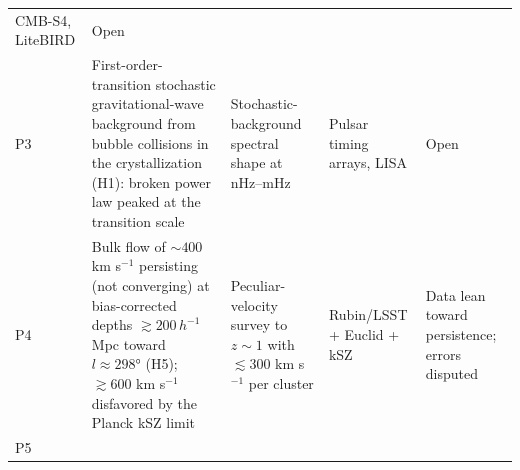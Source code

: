 \documentclass[
]{article}
\begin{document}
\begin{longtable}[]{@{}lllll@{}}
\begin{minipage}[t]{0.19\columnwidth}
CMB-S4, LiteBIRD\strut
\end{minipage} & \begin{minipage}[t]{0.19\columnwidth}\raggedright
Open\strut
\end{minipage}\tabularnewline
\begin{minipage}[t]{0.11\columnwidth}\raggedright
P3\strut
\end{minipage} & \begin{minipage}[t]{0.19\columnwidth}\raggedright
First-order-transition stochastic gravitational-wave background from
bubble collisions in the crystallization (H1): broken power law peaked
at the transition scale\strut
\end{minipage} & \begin{minipage}[t]{0.19\columnwidth}\raggedright
Stochastic-background spectral shape at nHz--mHz\strut
\end{minipage} & \begin{minipage}[t]{0.19\columnwidth}\raggedright
Pulsar timing arrays, LISA\strut
\end{minipage} & \begin{minipage}[t]{0.19\columnwidth}\raggedright
Open\strut
\end{minipage}\tabularnewline
\begin{minipage}[t]{0.11\columnwidth}\raggedright
P4\strut
\end{minipage} & \begin{minipage}[t]{0.19\columnwidth}\raggedright
Bulk flow of \(\sim\!400\) km s\(^{-1}\) persisting (not converging) at
bias-corrected depths \(\gtrsim 200\,h^{-1}\) Mpc toward
\(l \approx 298°\) (H5); \(\gtrsim 600\) km s\(^{-1}\) disfavored by the
Planck kSZ limit\strut
\end{minipage} & \begin{minipage}[t]{0.19\columnwidth}\raggedright
Peculiar-velocity survey to \(z \sim 1\) with \(\lesssim 300\) km
s\(^{-1}\) per cluster\strut
\end{minipage} & \begin{minipage}[t]{0.19\columnwidth}\raggedright
Rubin/LSST + Euclid + kSZ\strut
\end{minipage} & \begin{minipage}[t]{0.19\columnwidth}\raggedright
Data lean toward persistence; errors disputed\strut
\end{minipage}\tabularnewline
\begin{minipage}[t]{0.11\columnwidth}\raggedright
P5\strut
\end{minipage} & \begin{minipage}[t]{0.19\columnwidth}\raggedright

\end{minipage}
\end{longtable}
\end{document}
